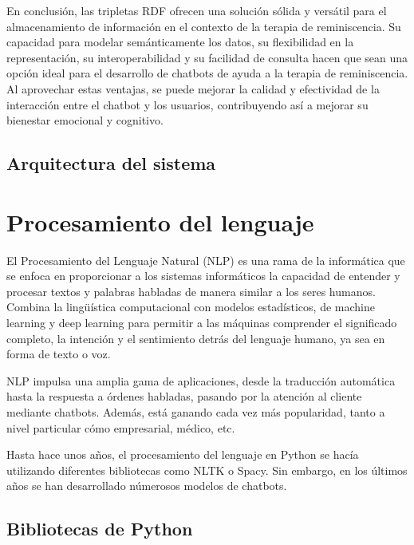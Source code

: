 	

	
En conclusión, las tripletas RDF ofrecen una solución sólida y versátil para el almacenamiento de información en el contexto de la terapia de reminiscencia. Su capacidad para modelar semánticamente los datos, su flexibilidad en la representación, su interoperabilidad y su facilidad de consulta hacen que sean una opción ideal para el desarrollo de chatbots de ayuda a la terapia de reminiscencia. Al aprovechar estas ventajas, se puede mejorar la calidad y efectividad de la interacción entre el chatbot y los usuarios, contribuyendo así a mejorar su bienestar emocional y cognitivo.
	
\subsection{Arquitectura del sistema}


\section{Procesamiento del lenguaje}


El Procesamiento del Lenguaje Natural (NLP) es una rama de la informática que se enfoca en proporcionar a los sistemas informáticos la capacidad de entender y procesar textos y palabras habladas de manera similar a los seres humanos. Combina la lingüística computacional con modelos estadísticos, de machine learning y deep learning para permitir a las máquinas comprender el significado completo, la intención y el sentimiento detrás del lenguaje humano, ya sea en forma de texto o voz.

NLP impulsa una amplia gama de aplicaciones, desde la traducción automática hasta la respuesta a órdenes habladas, pasando por la atención al cliente mediante chatbots. Además, está ganando cada vez más popularidad, tanto a nivel particular cómo empresarial, médico, etc. 

Hasta hace unos años, el procesamiento del lenguaje en Python se hacía utilizando diferentes bibliotecas como NLTK o Spacy. Sin embargo, en los últimos años se han desarrollado númerosos modelos de chatbots.

\subsection{Bibliotecas de Python}
